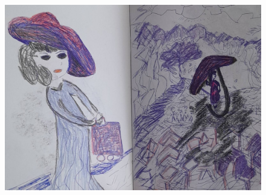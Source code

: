 \documentclass[12pt, a4paper, twoside]{book} %
\begin{document}
\clearpage

\begin{figure}[H]
	\centering
	\includegraphics[width=\textwidth]{./images/1f81324df23788.jpg}
\end{figure}

\clearpage
\end{document}
